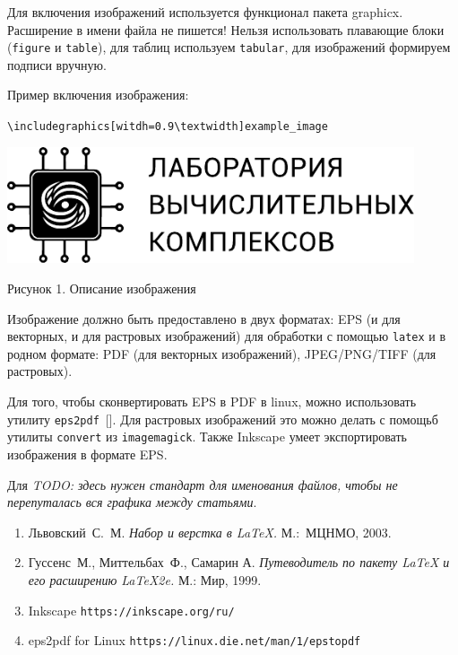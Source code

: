 Для включения изображений используется функционал пакета graphicx. Расширение в имени файла не пишется! Нельзя использовать плавающие блоки (\texttt{figure} и \texttt{table}), для таблиц используем \texttt{tabular}, для изображений формируем подписи вручную.

Пример включения изображения:

\texttt{\textbackslash includegraphics[witdh=0.9\textbackslash textwidth]{example\_image}}

\medskip
\includegraphics[width=0.9\textwidth]{example_image}
\begin{centering}
 \medskip
 Рисунок 1. Описание изображения\par
 \medskip
\end{centering}

Изображение должно быть предоставлено в двух форматах: EPS (и для векторных, и для растровых изображений) для обработки с помощью \texttt{latex} и в родном формате: PDF (для векторных изображений), JPEG/PNG/TIFF (для растровых).

Для того, чтобы сконвертировать EPS в PDF в linux, можно использовать утилиту \texttt{eps2pdf}~[]. Для растровых изображений это можно делать с помощьб утилиты \texttt{convert} из \texttt{imagemagick}. Также Inkscape умеет экспортировать изображения в формате EPS.


Для 
\textit{TODO: здесь нужен стандарт для именования файлов, чтобы не перепуталась вся графика между статьями}.

\References
\begin{enumerate}
\item
    Львовский~С.~М.
    \emph{Набор и верстка в \LaTeX.}
    М.:~МЦНМО, 2003.

\item
    Гуссенс~М., Миттельбах~Ф., Самарин А.
    \emph{Путеводитель по пакету \LaTeX{} и его расширению \LaTeX2e.}
    М.: Мир, 1999.
    
\item
    Inkscape 
    \texttt{https://inkscape.org/ru/}
    
\item
    eps2pdf for Linux
    \texttt{https://linux.die.net/man/1/epstopdf}
\end{enumerate}
